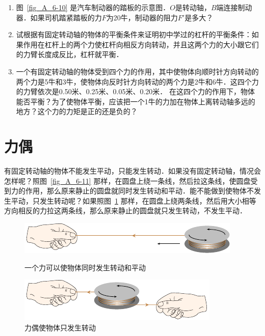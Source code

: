 \begin{enumerate}
    \item 图~\ref{fig_A_6-10} 是汽车制动器的踏板的示意图．$O$是转动轴，$B$端连接制动器．如果司机踏紧踏板的力$F$为20牛，制动器的阻力$F'$是多大？
    \item 试根据有固定转动轴的物体的平衡条件来证明初中学过的杠杆的平衡条件：如果作用在杠杆上的两个力使杠杆向相反方向转动，并且这两个力的大小跟它们的力臂长度成反比，杠杆就平衡．
    \item 一个有固定转动轴的物体受到四个力的作用，其中使物体向顺时针方向转动的两个力是5牛和3牛，使物体向反时针方向转动的两个力是2牛和6牛．这四个力的力臂依次是0.50米、0.25米、0.05米、0.20米．
    在这四个力的作用下，物体能否平衡？为了使物体平衡，应该把一个1牛的力加在物体上离转动轴多远的地方？这个力的力矩是正的还是负的？
\end{enumerate}


\section{力偶}


有固定转动轴的物体不能发生平动，只能发生转动．如果没有固定转动轴，情况会怎样呢？照图~\ref{fig_A_6-11} 那样，在圆盘上绕一条线，然后拉这条线，使圆盘受到力的作用，那么原来静止的圆盘就同时发生转动和平动．能不能做到使物体不发生平动，只发生转动呢？如果照图~\ref{fig_A_6-12} 那样，在圆盘上绕两条线，然后用大小相等方向相反的力拉这两条线，那么原来静止的圆盘就只发生转动，不发生平动．

\begin{figure}[htbp]
    \centering
    \begin{minipage}[t]{0.5\textwidth}
        \centering
        \includegraphics{fig/A/6-11.pdf}
        \caption{一个力可以使物体同时发生转动和平动}\label{fig_A_6-11}
    \end{minipage}
    \hfill
    \begin{minipage}[t]{0.47\textwidth}
        \centering
        \includegraphics{fig/A/6-12.pdf}
        \caption{力偶使物体只发生转动}\label{fig_A_6-12}
    \end{minipage}
\end{figure}


